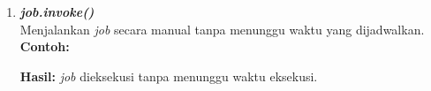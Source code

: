 \begin{enumerate}[label*=\arabic*.,ref=\arabic*]
\begin{enumerate}[label*=\arabic*.,ref=\arabic*]
\begin{enumerate}[label=\alph*.]
            \item \textit{\textbf{job.invoke()}}\\
            Menjalankan \textit{job} secara manual tanpa menunggu waktu yang dijadwalkan.\\
            \textbf{Contoh:}
            
            \textbf{Hasil:} \textit{job} dieksekusi tanpa menunggu waktu eksekusi.
                
        \end{enumerate}

    \end{enumerate}
\end{enumerate}